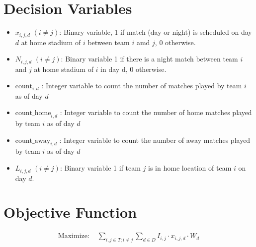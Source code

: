 \documentclass[a4paper, 12pt]{article}
\begin{document}
\section*{Decision Variables}
\begin{itemize}
    \item $x_{i,j,d}$ $(i \neq j)$: Binary variable, 1 if match (day or night) is scheduled on day $d$ at home stadium of $i$ between team $i$ amd $j$, 0 otherwise.
    \item $N_{i,j,d}$ $(i \neq j)$: Binary variable 1 if there is a night match between team $i$ and $j$ at home stadium of $i$ in day d, 0 otherwise.
    \item $\text{count}_{i,d}$ : Integer variable to count the number of matches played by team $i$ as of day $d$
    \item $\text{count\_home}_{i,d}$ : Integer variable to count the number of home matches played by team $i$ as of day $d$
    \item $\text{count\_away}_{i,d}$ : Integer variable to count the number of away matches played by team $i$ as of day $d$
    \item $L_{i,j,d}$ $(i \neq j)$: Binary variable 1 if team $j$ is in home location of team $i$ on day $d$.
    
\end{itemize}

\section*{Objective Function}
\begin{align*}
\text{Maximize: } & \sum_{i,j \in T; i \neq j} \sum_{d \in D} I_{i,j} \cdot x_{i,j,d} \cdot W_{d} 
\end{align*}
\end{document}
